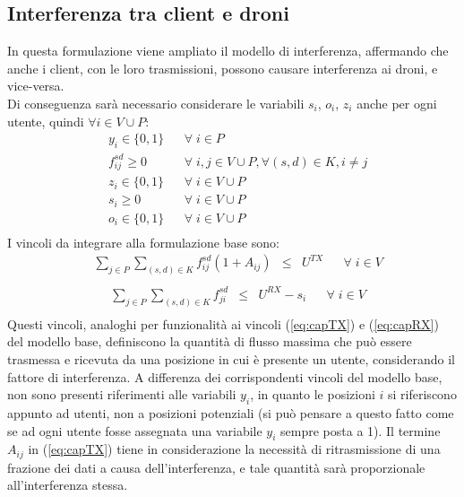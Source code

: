 \subsection{Interferenza tra client e droni}
In questa formulazione viene ampliato il modello di interferenza, affermando che anche i client, con le loro trasmissioni, possono causare interferenza ai droni, e vice-versa. \\
Di conseguenza sarà necessario considerare le variabili $s_i$, $o_i$, $z_i$ anche per ogni utente, quindi $ \forall i \in V \cup P$:
%
	\begin{equation*} \label{eq:Vvars}
	\begin{array}{rlclcl}	
	& y_i \in \{0, 1\} && \forall \; i \in P \\
	& f^{sd}_{ij} \ge 0 && \forall \; i , j \in V \cup P, \forall (s,d) \in K, i \neq j \\
	& z_i \in \{0, 1\} && \forall \; i \in V \cup P \\
	& s_i \ge 0 && \forall \; i \in V \cup P \\
	& o_i \in \{0, 1\} && \forall \; i \in V \cup P \\
	\end{array}
	\end{equation*}
%
I vincoli da integrare alla formulazione base sono:
%
\begin{equation*} \label{eq:VcapTX}
	\begin{array}{rrclcl}
		& \displaystyle \sum_{j \in P } \displaystyle \sum_{(s,d) \in K} f^{sd}_{ij} (1 + A_{ij}) & \leq & U^{TX} && \forall \; i \in V \\
	\end{array}
\end{equation*}
%	
%	
\begin{equation*} \label{eq:VcapRX}
	\begin{array}{rrclcl}
	&\displaystyle \sum_{j \in P} \displaystyle \sum_{(s,d) \in K} f^{sd}_{ji} & \leq & U^{RX} - s_{i}  && \forall \; i \in V\\
	\end{array}
\end{equation*}
%
Questi vincoli, analoghi per funzionalità ai vincoli (\ref{eq:capTX}) e (\ref{eq:capRX}) del modello base, definiscono la quantità di flusso massima che può essere trasmessa e ricevuta da una posizione in cui è presente un utente, considerando il fattore di interferenza. A differenza dei corrispondenti vincoli del modello base, non sono presenti riferimenti alle variabili $y_i$, in quanto le posizioni $i$ si riferiscono appunto ad utenti, non a posizioni potenziali (si può pensare a questo fatto come se ad ogni utente fosse assegnata una variabile $y_i$ sempre posta a 1). Il termine $A_{ij}$ in (\ref{eq:capTX}) tiene in considerazione la necessità di ritrasmissione di una frazione dei dati a causa dell'interferenza, e tale quantità sarà proporzionale all'interferenza stessa. \\
